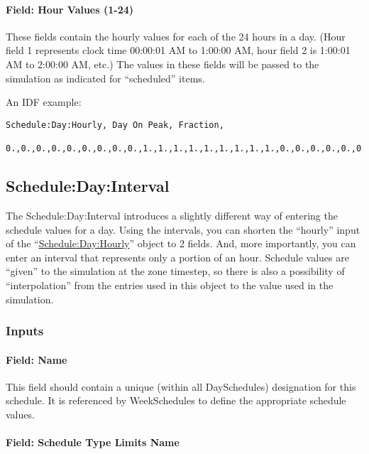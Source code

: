 \paragraph{Field: Hour Values (1-24)}\label{field-hour-values-1-24}

These fields contain the hourly values for each of the 24 hours in a day. (Hour field 1 represents clock time 00:00:01 AM to 1:00:00 AM, hour field 2 is 1:00:01 AM to 2:00:00 AM, etc.) The values in these fields will be passed to the simulation as indicated for ``scheduled'' items.

An IDF example:

\begin{lstlisting}
Schedule:Day:Hourly, Day On Peak, Fraction,
  0.,0.,0.,0.,0.,0.,0.,0.,0.,1.,1.,1.,1.,1.,1.,1.,1.,1.,0.,0.,0.,0.,0.,0.;
\end{lstlisting}

\subsection{Schedule:Day:Interval}\label{scheduledayinterval}

The Schedule:Day:Interval introduces a slightly different way of entering the schedule values for a day. Using the intervals, you can shorten the ``hourly'' input of the ``\hyperref[scheduledayhourly]{Schedule:Day:Hourly}'' object to 2 fields. And, more importantly, you can enter an interval that represents only a portion of an hour. Schedule values are ``given'' to the simulation at the zone timestep, so there is also a possibility of ``interpolation'' from the entries used in this object to the value used in the simulation.

\subsubsection{Inputs}\label{inputs-2-036}

\paragraph{Field: Name}\label{field-name-2-034}

This field should contain a unique (within all DaySchedules) designation for this schedule. It is referenced by WeekSchedules to define the appropriate schedule values.

\paragraph{Field: Schedule Type Limits Name}\label{field-schedule-type-limits-name-1-000}


